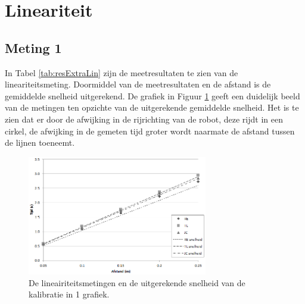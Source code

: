 \documentclass{report}
\begin{document}
\section{Lineariteit}
\subsection*{Meting 1}
In Tabel \ref{tab:resExtraLin} zijn de meetresultaten te zien van de lineariteitsmeting.
Doormiddel van de meetresultaten en de afstand is de gemiddelde snelheid uitgerekend.
De grafiek in Figuur \ref{fig:linGraph} geeft een duidelijk beeld van de metingen ten opzichte van de uitgerekende gemiddelde snelheid.
Het is te zien dat er door de afwijking in de rijrichting van de robot, deze rijdt in een cirkel,
de afwijking in de gemeten tijd groter wordt naarmate de afstand tussen de lijnen toeneemt.

\begin{figure}[H]
	\centering
	\includegraphics[width=0.7\textwidth]{lineairiteit}
	\caption{De lineairiteitsmetingen en de uitgerekende snelheid van de kalibratie in 1 grafiek.}
	\label{fig:linGraph}
\end{figure}
\end{document}
